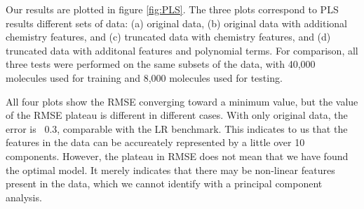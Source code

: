 \documentclass[11pt]{article}
\begin{document}
Our results are plotted in figure \ref{fig:PLS}.  The three plots correspond to PLS results different sets of data: (a) original data, (b) original data with additional chemistry features, and (c) truncated data with chemistry features, and (d) truncated data with additonal features and polynomial terms. For comparison, all three tests were performed on the same subsets of the data, with 40,000 molecules used for training and 8,000 molecules used for testing. 

All four plots show the RMSE converging toward a minimum value, but the value of the RMSE plateau is different in different cases. With only original data, the error is ~0.3, comparable with the LR benchmark. This indicates to us that the features in the data can be accureately represented by a little over 10 components. However, the plateau in RMSE does not mean that we have found the optimal model. It merely indicates that there may be non-linear features present in the data, which we cannot identify with a principal component analysis. 
\end{document}
